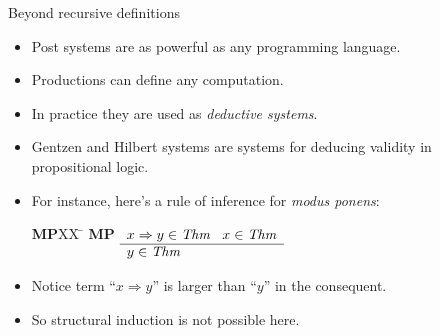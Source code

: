 \begin{wideslide}[bm=,toc=]{Beyond recursive definitions}
\begin{itemize}
\item Post systems are as powerful as any programming language.
\item Productions can define any computation.
\item In practice they are used as {\em deductive systems\/}.
\item Gentzen and Hilbert systems are systems for deducing validity in propositional logic.
\item For instance, here's a rule of inference for {\em modus ponens\/}:
\vspace{-1em}
\begin{tabbing}
{\bf MP}XX \=  \kill
{\bf MP} \>
        \(\begin{array}[t]{l}
        x\Rightarrow y \in\mbox{\it Thm\/}\;\;\;x\in\mbox{\it Thm\/} \\
        \hline
        y\in\mbox{\it Thm\/}
        \end{array}\)
\end{tabbing}
\item Notice term ``$x\Rightarrow y$'' is larger than ``$y$'' in the consequent.
\item So structural induction is not possible here.
\end{itemize}
\end{wideslide}


